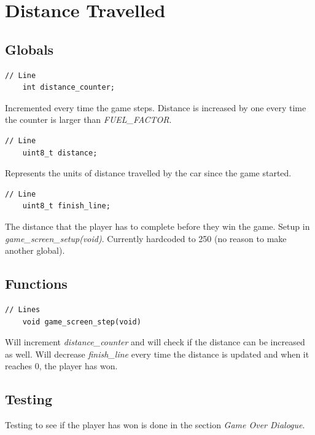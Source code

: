\documentclass{article}
\begin{document}
\clearpage

\section{Distance Travelled}
\subsection*{Globals}
\begin{lstlisting}[style=CStyle]
	// Line 
	int distance_counter;
\end{lstlisting}
Incremented every time the game steps. Distance is increased by one every time the counter is larger than \emph{FUEL\_FACTOR}.
\begin{lstlisting}[style=CStyle]
	// Line
	uint8_t distance;
\end{lstlisting}
Represents the units of distance travelled by the car since the game started. 
\begin{lstlisting}[style=CStyle]
	// Line 
	uint8_t finish_line;
\end{lstlisting}
The distance that the player has to complete before they win the game. Setup in \emph{game\_screen\_setup(void)}. Currently hardcoded to 250 (no reason to make another global).
\newline

\subsection*{Functions}
\begin{lstlisting}[style=CStyle]
	// Lines 
	void game_screen_step(void)
\end{lstlisting}
Will increment \emph{distance\_counter} and will check if the distance can be increased as well. Will decrease \emph{finish\_line} every time the distance is updated and when it reaches 0, the player has won.
\newline

\subsection*{Testing}
Testing to see if the player has won is done in the section \emph{Game Over Dialogue}. 
\end{document}
